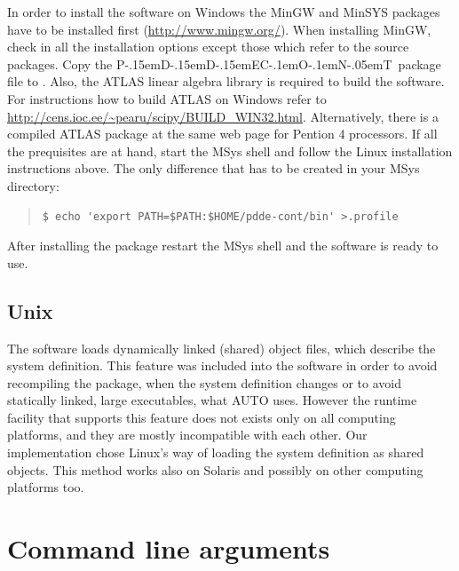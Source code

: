 \documentclass[10pt,a4paper]{ddedoc}
\def\pdde{{P\kern-.15emD\kern-.15emD\kern-.15emE\raisebox{.25ex}{-}C\kern-.1emO\kern-.1emN\kern-.05emT}}
\begin{document}
In order to install the software on Windows the MinGW and MinSYS packages have to be installed first (\url{http://www.mingw.org/}). When installing MinGW, check in all the installation options except those which refer to the source packages. Copy the \pdde\ package file  to . Also, the ATLAS linear algebra library is required to build the software. For instructions how to build ATLAS on Windows refer to \url{http://cens.ioc.ee/~pearu/scipy/BUILD_WIN32.html}. Alternatively, there is a compiled ATLAS package at the same web page for Pention 4 processors. If all the prequisites are at hand, start the MSys shell and follow the Linux installation instructions above. The only difference that  has to be created in your MSys  directory:
{ \small \begin{quote} \begin{lstlisting}[basicstyle=\tt,frame=single]
$ echo 'export PATH=$PATH:$HOME/pdde-cont/bin' >.profile
\end{lstlisting} \end{quote} } \noindent
After installing the package restart the MSys shell and the software is ready to use.

\subsection{Unix}

The software loads dynamically linked (shared) object files, which describe the system definition. This feature was included into the software in order to avoid recompiling the package, when the system definition changes or to avoid statically linked, large executables, what AUTO uses. However the runtime facility that supports this feature does not exists only on all computing platforms, and they are mostly incompatible with each other. Our implementation chose Linux's way of loading the system definition as shared objects. This method works also on Solaris and possibly on other computing platforms too.

\section{Command line arguments}
\end{document}
